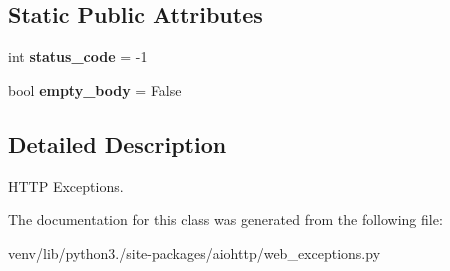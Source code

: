 \subsection*{Static Public Attributes}
\begin{DoxyCompactItemize}
\item 
\mbox{\label{classaiohttp_1_1web__exceptions_1_1_h_t_t_p_exception_adf90ee24f6eef944d40738ab52118812}} 
int {\bfseries status\+\_\+code} = -\/1
\item 
\mbox{\label{classaiohttp_1_1web__exceptions_1_1_h_t_t_p_exception_a750a1112d808a0ad3e12a22b23b95eae}} 
bool {\bfseries empty\+\_\+body} = False
\end{DoxyCompactItemize}


\subsection{Detailed Description}
H\+T\+TP Exceptions. 

The documentation for this class was generated from the following file\+:\begin{DoxyCompactItemize}
\item 
venv/lib/python3./site-\/packages/aiohttp/web\+\_\+exceptions.\+py\end{DoxyCompactItemize}
